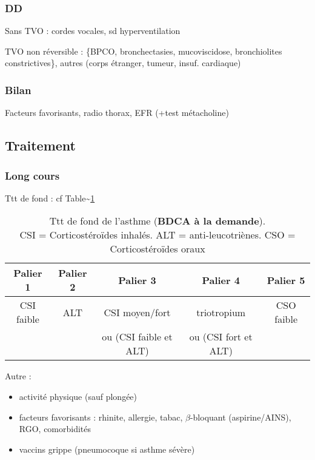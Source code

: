 \documentclass{book}
\begin{document}
\subsubsection{DD}
\label{sec:org71850e1}
Sans TVO : cordes vocales, sd hyperventilation

TVO non réversible : \{BPCO, bronchectasies, mucoviscidose, bronchiolites
constrictives\}, autres (corps étranger, tumeur, insuf. cardiaque)
\subsubsection{Bilan}
\label{sec:org3eae24d}
Facteurs favorisants, radio thorax, EFR (+test métacholine)

\subsection{Traitement}
\label{sec:orgdd9ecc8}

\subsubsection{Long cours}
\label{sec:orge511864}
Ttt de fond : cf Table\textasciitilde{}\ref{tab:ttt_asthme}

\begin{table}
  \centering
  \begin{tabular}{ccccc}
    \toprule
    Palier 1 & Palier 2 & Palier 3 & Palier 4 & Palier 5 \\
    \midrule
    CSI faible & ALT & CSI moyen/fort & triotropium & CSO faible\\
             & & ou (CSI faible et ALT) & ou (CSI fort et ALT) &\\
  \bottomrule                                                              
  \end{tabular}
  \caption{Ttt de fond de l'asthme (\textbf{BDCA à la demande}).\\
    CSI = Corticostéroïdes inhalés. ALT =
    anti-leucotriènes. CSO = Corticostéroïdes oraux}
  \label{tab:ttt_asthme}
\end{table}

Autre : 

\begin{itemize}
\item activité physique (sauf plongée)
\item facteurs favorisants : rhinite, allergie, tabac, \(\beta\)-bloquant
(aspirine/AINS), RGO, comorbidités
\item vaccins grippe (pneumocoque si asthme sévère)
\end{itemize}
\end{document}
